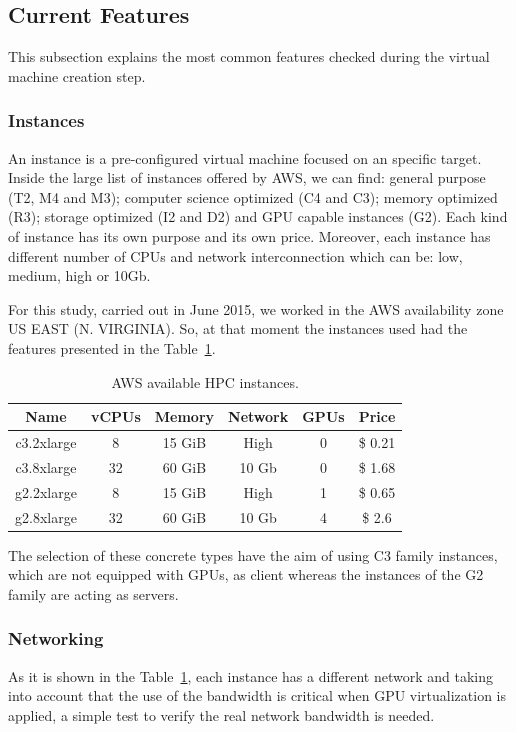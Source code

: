 \documentclass[a4paper,twoside]{article}
\begin{document}
\subsection{Current Features}
This subsection explains the most common features checked during 
the virtual machine creation step.

\subsubsection{Instances}

An instance is a pre-configured virtual machine focused on an 
specific target. Inside the large list of instances offered by AWS, 
we can find: general purpose (T2, M4 and M3); computer science optimized 
(C4 and C3); memory optimized (R3); storage optimized (I2 and D2) and 
GPU capable instances (G2). Each kind of instance has its own purpose and its 
own price. Moreover, each instance has different number of CPUs and network 
interconnection which can be: low, medium, high or 10Gb.

For this study, carried out in June 2015, we worked in the AWS availability zone US EAST (N. VIRGINIA). 
So, at that moment the instances used had the features presented in the Table~\ref{table:awsInstances}. 

\begin{table}[htb]
\renewcommand{\arraystretch}{1.3}
\caption{AWS available HPC instances.}
\label{table:awsInstances}
\tabcolsep=0.09cm
\begin{center}\begin{tabular}{cccccc}
Name & vCPUs & Memory & Network & GPUs & Price\\ \hline \hline
c3.2xlarge & 8 & 15 GiB & High & 0 & \$ 0.21\\ \hline
c3.8xlarge & 32 & 60 GiB & 10 Gb & 0 & \$ 1.68 \\ \hline
g2.2xlarge & 8 & 15 GiB & High & 1 & \$ 0.65\\ \hline
g2.8xlarge & 32 & 60 GiB & 10 Gb & 4 & \$ 2.6 \\ \hline
\end{tabular}\end{center}\end{table}

The selection of these concrete types have the aim of using C3 family instances, which are not equipped with GPUs, as client whereas the instances of the G2 family are acting as servers.   

\subsubsection{Networking}
As it is shown in the Table~\ref{table:awsInstances}, each instance has a different 
network and taking into account that the use of the bandwidth 
is critical when GPU virtualization is applied, a simple test to verify the 
real network bandwidth is needed.
\end{document}
